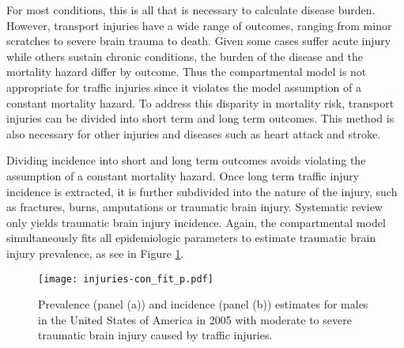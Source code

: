 For most conditions, this is all that is necessary to calculate
disease burden.  However, transport injuries have a wide range of
outcomes, ranging from minor scratches to severe brain trauma to
death.  Given some cases suffer acute injury while others sustain
chronic conditions, the burden of the disease and the mortality hazard
differ by outcome.  Thus the compartmental model is not appropriate
for traffic injuries since it violates the model assumption of a
constant mortality hazard.  To address this disparity in mortality
risk, transport injuries can be divided into short term and long term
outcomes.  This method is also necessary for other injuries and
diseases such as heart attack and stroke.

Dividing incidence into short and long term outcomes avoids violating
the assumption of a constant mortality hazard.  Once long term traffic
injury incidence is extracted, it is further subdivided into the
nature of the injury, such as fractures, burns, amputations or
traumatic brain injury.  Systematic review only yields traumatic brain
injury incidence.  Again, the compartmental model simultaneously fits
all epidemiologic parameters to estimate traumatic brain injury
prevalence, as see in Figure \ref{fig:app-injury brain fit}.

    \begin{figure}[h]
        \begin{center}
            \texttt{[image: injuries-con\_fit\_p.pdf]}
            \caption{Prevalence (panel (a)) and incidence (panel (b))
              estimates for males in the United States of America in
              2005 with moderate to severe traumatic brain injury
              caused by traffic injuries.}
            \label{fig:app-injury brain fit}
        \end{center}
    \end{figure}



